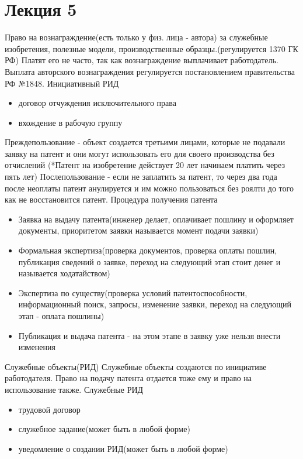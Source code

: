 \documentclass[12pt]{article}
\begin{document}
\section{Лекция 5}
Право на вознаграждение(есть только у физ. лица - автора) за служебные изобретения, полезные модели, производственные образцы.(регулируется 1370 ГК РФ)
Платят его не часто, так как вознаграждение выплачивает работодатель. Выплата авторского вознаграждения регулируется постановлением правительства РФ №1848.
Инициативный РИД 
\begin {itemize} 
\item 
договор отчуждения исключительного права
\item 
вхождение в рабочую группу
\end{itemize}
Преждепользование - объект создается третьими лицами, которые не подавали заявку на патент и они могут использовать его для своего производства без отчислений
(*Патент на изобретение действует 20 лет начинаем платить через пять лет)
Послепользование - если не заплатить за патент, то через два года после неоплаты патент анулируется и им можно пользоваться без роялти до того как не восстановится патент.
Процедура получения патента
\begin{itemize}
    \item
    Заявка на выдачу патента(инженер делает, оплачивает пошлину и оформляет документы, приоритетом заявки называется момент подачи заявки)
    \item
    Формальная экспертиза(проверка документов, проверка оплаты пошлин, публикация сведений о заявке, переход на следующий этап стоит денег и называется ходатайством)
    \item
    Экспертиза по существу(проверка условий патентоспособности, информационный поиск, запросы, изменение заявки, переход на следующий этап - оплата пошлины)
    \item
    Публикация и выдача патента -  на этом этапе в заявку уже нельзя внести изменения
\end{itemize}
Служебные объекты(РИД)
Служебные объекты создаются по инициативе работодателя. Право на подачу патента отдается тоже ему и право на использование также.
Служебные РИД\begin{itemize}
    \item трудовой договор
    \item служебное задание(может быть в любой форме)
    \item уведомление о создании РИД(может быть в любой форме)
\end{itemize}
\end{document}
